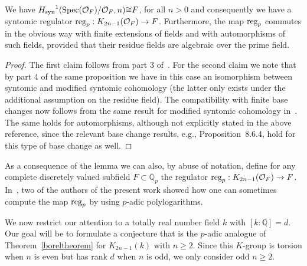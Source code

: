 \documentclass{amsart}
\begin{document}
\begin{lemma}\label{synlemma}
  We have ${H_{\textup{syn}}}^1({\operatorname{Spec}}({\mathcal O}_F)/{\mathcal O}_F,n) {\cong} F$, for all
  $n>0$ and consequently we have a syntomic regulator
  ${\textup{reg}}_p: K_{2n-1}({\mathcal O}_F)\to F$. 
  Furthermore, the map ${\textup{reg}}_p$ commutes in the obvious way with
  finite extensions of fields and with automorphisms of such fields,
  provided that their residue fields are 
  algebraic over the prime field.
\end{lemma}

\begin{proof}
  The first claim follows from part 3
  of~\cite[Proposition~8.6]{Bes98a}.  For the second claim we note
  that 
  by part 4 of the same proposition we have in this case an
  isomorphism between syntomic and modified syntomic cohomology (the
  latter only exists under the additional assumption on the residue
  field). The compatibility with finite base changes now follows from
  the same result for modified syntomic cohomology
  in~\cite[Proposition~8.8]{Bes98a}. The same holds for automorphisms,
  although not explicitly stated in the above reference, since the
  relevant base change results, e.g., Proposition~8.6.4, hold for this
  type of base change as well.
\end{proof}

As a consequence of the lemma we can also, by abuse of notation,
define for any complete discretely valued subfield $F\subset {{\overline {\mathbb Q}_p}}$ the
regulator ${\textup{reg}}_p: K_{2n-1}({\mathcal O}_F)\to F$. In~\cite{BdJ03}, two of the authors of the present
work showed how one can sometimes compute the map ${\textup{reg}}_p$ by using
{$p$-adic{\futurelet{}}} polylogarithms.

We now restrict our attention to a totally real number field $ k $ with $ [k:{\mathbb Q}] = d $.  Our goal will
be to formulate a conjecture that is the {$p$-adic{\futurelet{}}} analogue of Theorem~\ref{boreltheorem} for $ K_{2n-1}(k) $
with $ n \ge 2 $.  Since this $ K $-group is torsion when $ n $ is even but has rank $ d $ when $ n $ is odd,
we only consider odd $ n\ge 2 $.
\end{document}
